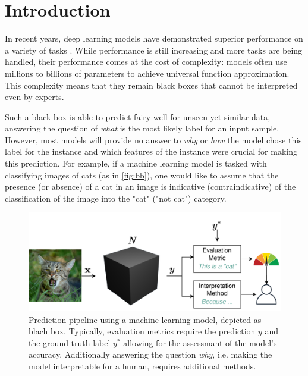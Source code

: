 \section{Introduction}
\label{sec:introduction}




In recent years, deep learning models have demonstrated superior performance on a variety of tasks \cite{ruede2020multi, brinker2019deep, nguyen2020super}. While performance is still increasing and more tasks are being handled, their performance comes at the cost of complexity: models often use millions to billions of parameters to achieve universal function approximation.
This complexity means that they remain black boxes that cannot be interpreted even by experts.

Such a black box is able to predict fairy well for unseen yet similar data, answering the question of \textit{what} is the most likely label for an input sample. 
However, most models will provide no answer to \textit{why} or \textit{how} the model chose this label for the instance and which features of the instance were crucial for making this prediction. For example, if a machine learning model is tasked with classifying images of cats (as in \autoref{fig:bb}), one would like to assume that the presence (or absence) of a cat in an image is indicative (contraindicative) of the classification of the image into the "cat" ("not cat") category.

\begin{figure}[t]
    \centering
    \includegraphics[width=\linewidth]{figures/bb_cat.png}
    \caption{Prediction pipeline using a machine learning model, depicted as blach box. Typically, evaluation metrics require the prediction $y$ and the ground truth label $y^*$ allowing for the assessmant of the model's accuracy. Additionally answering the question \textit{why}, i.e. making the model interpretable for a human, requires additional methods.}
    \label{fig:bb}
    \vspace{-0.3cm}
\end{figure}

